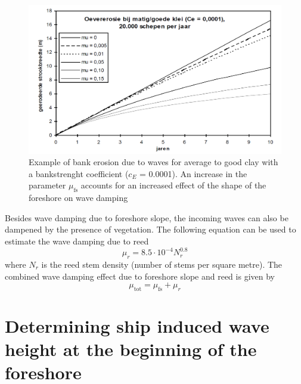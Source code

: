 \begin{figure}[!hb]
\includegraphics[width=\textwidth]{figures/Fig4-2.png}
\caption{Example of bank erosion due to waves for average to good clay with a bankstrenght coefficient ($c_E$ = 0.0001). An increase in the parameter $\mu_\text{fs}$ accounts for an increased effect of the shape of the foreshore on wave damping}
\label{Fig4.2}
\end{figure}

Besides wave damping due to foreshore slope, the incoming waves can also be dampened by the presence of vegetation.
The following equation can be used to estimate the wave damping due to reed
%
\begin{equation}
\mu_r = 8.5 \cdot 10^{-4} N_r^{0.8}
\end{equation}
%
where $N_r$ is the reed stem density (number of stems per square metre).
The combined wave damping effect due to foreshore slope and reed is given by
%
\begin{equation}
\mu_\text{tot} = \mu_\text{fs} + \mu_r
\end{equation}
%
\clearpage
\section{Determining ship induced wave height at the beginning of the foreshore} \label{Sec:shipwaves}

